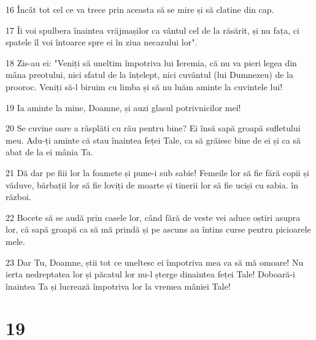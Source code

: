 \par 16 Încât tot cel ce va trece prin aceasta să se mire și să clatine din cap.
\par 17 Îi voi spulbera înaintea vrăjmașilor ca vântul cel de la răsărit, și nu fața, ci spatele îl voi întoarce spre ei în ziua necazului lor".
\par 18 Zis-au ei: "Veniți să uneltim împotriva lui Ieremia, că nu va pieri legea din mâna preotului, nici sfatul de la înțelept, nici cuvântul (lui Dumnezeu) de la prooroc. Veniți să-l biruim cu limba și să nu luăm aminte la cuvintele lui!
\par 19 Ia aminte la mine, Doamne, și auzi glasul potrivnicilor mei!
\par 20 Se cuvine oare a răsplăti cu rău pentru bine? Ei însă sapă groapă sufletului meu. Adu-ți aminte că stau înaintea feței Tale, ca să grăiesc bine de ei și ca să abat de la ei mânia Ta.
\par 21 Dă dar pe fiii lor la foamete și pune-i sub sabie! Femeile lor să fie fără copii și văduve, bărbații lor să fie loviți de moarte și tinerii lor să fie uciși cu sabia. în război.
\par 22 Bocete să se audă prin casele lor, când fără de veste vei aduce oștiri asupra lor, că sapă groapă ca să mă prindă și pe ascuns au întins curse pentru picioarele mele.
\par 23 Dar Tu, Doamne, știi tot ce uneltesc ei împotriva mea ca să mă omoare! Nu ierta nedreptatea lor și păcatul lor nu-l șterge dinaintea feței Tale! Doboară-i înaintea Ta și lucrează împotriva lor la vremea mâniei Tale!

\chapter{19}

